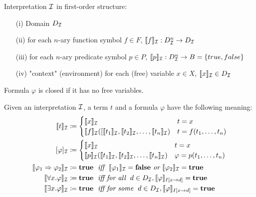 

\begin{definition}[Interpretation]
    Interpretation $\mathcal{I}$ in first-order structure: 
    \begin{itemize}
        \item[(i)] Domain $D_{\mathcal{I}}$
        \item[(ii)] for each $n$-ary function symbol $f \in F$, $\llbracket f \rrbracket_{\mathcal{I}}: D_{\mathcal{I}}^n \to D_{\mathcal{I}}$
         \item[(iii)]  for each $n$-ary predicate symbol $p \in P$, $\llbracket p \rrbracket_{\mathcal{I}}: D_{\mathcal{I}}^n \to B = \{true,false\}$
        \item[(iv)]  "context" (environment) for each (free) variable $x \in X$, $\llbracket x \rrbracket_{\mathcal{I}} \in D_{\mathcal{I}}$
    \end{itemize}
    Formula $\varphi$ is closed if it has no free variables.
\end{definition}


\begin{definition}[Semantics]
Given an interpretation $\mathcal{I}$, a term $t$ and a formula $\varphi$ have the following meaning: 
\begin{align*}
     \llbracket t \rrbracket_{\mathcal{I}} &\coloneqq \begin{cases}
         \llbracket x \rrbracket_{\mathcal{I}} & t=x  \\
         \llbracket f \rrbracket_{\mathcal{I}}([ \llbracket t_1 \rrbracket_{\mathcal{I}},  \llbracket t_2 \rrbracket_{\mathcal{I}}, \dots,  \llbracket t_n \rrbracket_{\mathcal{I}}) & t=f(t_1, \dots, t_n)
    \end{cases} \\
     [\varphi]_{\mathcal{I}} &\coloneqq \begin{cases}
        \llbracket x \rrbracket_{\mathcal{I}} & t=x  \\
        \llbracket p \rrbracket_{\mathcal{I}}(\llbracket t_1 \rrbracket_{\mathcal{I}}, \llbracket t_2 \rrbracket_{\mathcal{I}}, \dots, \llbracket t_n \rrbracket_{\mathcal{I}}) & \varphi = p(t_1, \dots, t_n)
    \end{cases}\\
     \llbracket \varphi_1 \Rightarrow \varphi_2 \rrbracket_{\mathcal{I}} &\coloneqq \mathbf{true} \; \textit{ iff } \; \llbracket \varphi_1 \rrbracket_{\mathcal{I}} = \mathbf{false} \textit{ or } \llbracket \varphi_2 \rrbracket_{\mathcal{I}} = \mathbf{true} \\
     \llbracket \forall x. \varphi \rrbracket_{\mathcal{I}} &\coloneqq \mathbf{true} \; \textit{ iff for all } \;  d \in D_{\mathcal{I}}, \llbracket \varphi \rrbracket_{I[x \to d]}=\mathbf{true} \\ 
     \llbracket \exists x. \varphi \rrbracket_{\mathcal{I}} &\coloneqq \mathbf{true} \; \textit{ iff for some } \; d \in D_{\mathcal{I}}, \llbracket \varphi \rrbracket_{I[x \to d]}=\mathbf{true}
\end{align*}
\end{definition}

